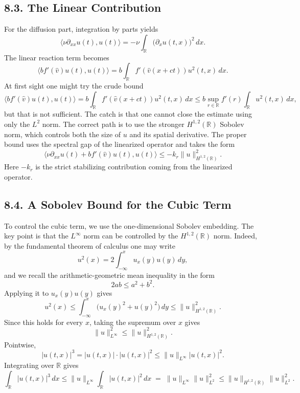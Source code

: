 \documentclass[11pt]{article}
\theoremstyle{definition}
\theoremstyle{remark}
\begin{document}
\subsection*{8.3. The Linear Contribution}
For the diffusion part, integration by parts yields
\[
\langle \nu\partial_{xx}u(t),u(t)\rangle
=
-\nu\int_{\mathbb R} \bigl(\partial_xu(t,x)\bigr)^2\,dx.
\]
The linear reaction term becomes
\[
\langle b f'(\hat v)u(t),u(t)\rangle
=
b\int_{\mathbb R} f'(\hat v(x+ct))u^2(t,x)\,dx.
\]
At first sight one might try the crude bound
\[
\langle b f'(\hat v)u(t),u(t)\rangle
=
b\int_{\mathbb R} f'(\hat v(x+ct))u^2(t,x)\,dx
\leq
b\sup_{r\in\mathbb R} f'(r)\int_{\mathbb R} u^2(t,x)\,dx,
\]
but that is not sufficient. The catch is that one cannot close the estimate using only the $L^2$ norm. The correct path is to use the stronger $H^{1,2}(\mathbb R)$ Sobolev norm, which controls both the size of $u$ and its spatial derivative. The proper bound uses the spectral gap of the linearized operator and takes the form
\[
\langle \nu\partial_{xx}u(t)+bf'(\hat v)u(t),u(t)\rangle
\leq
-k_r\|u\|_{H^{1,2}(\mathbb R)}^2.
\]
Here $-k_r$ is the strict stabilizing contribution coming from the linearized operator.

\subsection*{8.4. A Sobolev Bound for the Cubic Term}
To control the cubic term, we use the one-dimensional Sobolev embedding. The key point is that the $L^\infty$ norm can be controlled by the $H^{1,2}(\mathbb R)$ norm. Indeed, by the fundamental theorem of calculus one may write
\[
u^2(x)=2\int_{-\infty}^x u_x(y)u(y)\,dy,
\]
and we recall the arithmetic-geometric mean inequality in the form
\[
2ab\le a^2+b^2.
\]
Applying it to $u_x(y)u(y)$ gives
\[
u^2(x)
\leq
\int_{-\infty}^x \bigl(u_x(y)^2+u(y)^2\bigr)\,dy
\leq
\|u\|_{H^{1,2}(\mathbb R)}^2.
\]
Since this holds for every $x$, taking the supremum over $x$ gives
\[
\|u\|_{L^\infty}^2 \leq \|u\|_{H^{1,2}(\mathbb R)}^2.
\]
Pointwise,
\[
|u(t,x)|^3
=
|u(t,x)|\cdot |u(t,x)|^2
\leq
\|u\|_{L^\infty}|u(t,x)|^2.
\]
Integrating over $\mathbb R$ gives
\[
\int_{\mathbb R}|u(t,x)|^3\,dx
\leq
\|u\|_{L^\infty}\int_{\mathbb R}|u(t,x)|^2\,dx
\;=\;
\|u\|_{L^\infty}\|u\|_{L^2}^2
\leq
\|u\|_{H^{1,2}(\mathbb R)}\|u\|_{L^2}^2.
\]
\end{document}
